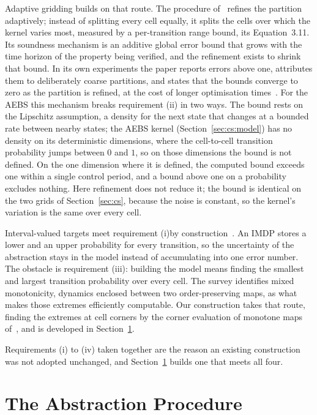 \documentclass[11pt,a4paper]{article}
\theoremstyle{plain}
\theoremstyle{remark}
\begin{document}
	Adaptive gridding builds on that route. The procedure of~\cite{Soudjani2013} refines the partition adaptively; instead of splitting every cell equally, it splits the cells over which the kernel varies most, measured by a per-transition range bound, its Equation~3.11. Its soundness mechanism is an additive global error bound that grows with the time horizon of the property being verified, and the refinement exists to shrink that bound. In its own experiments the paper reports errors above one, attributes them to deliberately coarse partitions, and states that the bounds converge to zero as the partition is refined, at the cost of longer optimisation times~\cite{Soudjani2013}.
	For the AEBS this mechanism breaks requirement (ii) in two ways. The bound rests on the Lipschitz assumption, a density for the next state that changes at a bounded rate between nearby states; the AEBS kernel (Section~\ref{sec:cs:model}) has no density on its deterministic dimensions, where the cell-to-cell transition probability jumps between $0$ and $1$, so on those dimensions the bound is not defined. On the one dimension where it is defined, the computed bound exceeds one within a single control period, and a bound above one on a probability excludes nothing. Here refinement does not reduce it; the bound is identical on the two grids of Section~\ref{sec:cs}, because the noise is constant, so the kernel's variation is the same over every cell.
	
	Interval-valued targets meet requirement (i)by construction~\cite{LSAZ22}. An IMDP stores a lower and an upper probability for every transition, so the uncertainty of the abstraction stays in the model instead of accumulating into one error number. The obstacle is requirement (iii): building the model means finding the smallest and largest transition probability over every cell. The survey identifies mixed monotonicity, dynamics enclosed between two order-preserving maps, as what makes those extremes efficiently computable. Our construction takes that route, finding the extremes at cell corners by the corner evaluation of monotone maps of~\cite{CA15}, and is developed in Section~\ref{sec:abs}.
	
	Requirements (i) to (iv) taken together are the reason an existing construction was not adopted unchanged, and Section~\ref{sec:abs} builds one that meets all four.

	
	\section{The Abstraction Procedure}
	\label{sec:abs}
	
\end{document}
